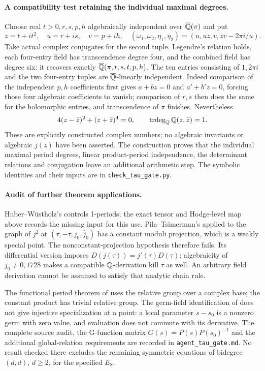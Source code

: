 \paragraph{A compatibility test retaining the individual maximal degrees.}
Choose real $t>0,r,s,p,h$ algebraically independent over $\overline{\mathbb Q}(\pi)$ and put
\[
 z=t+it^2,\quad u=r+is,\quad v=p+ih,\quad
 (\omega_1,\omega_2,\eta_1,\eta_2)
 =(u,uz,v,zv-2\pi i/u).
\]
Take actual complex conjugates for the second tuple. Legendre's relation holds, each four-entry field has transcendence degree four, and the combined field has degree six: it recovers exactly $\overline{\mathbb Q}(\pi,r,s,t,p,h)$. The ten entries consisting of $1,2\pi i$ and the two four-entry tuples are $\overline{\mathbb Q}$-linearly independent. Indeed comparison of the independent $p,h$ coefficients first gives $a+bz=0$ and $a'+b'\bar z=0$, forcing those four algebraic coefficients to vanish; comparison of $r,s$ then does the same for the holomorphic entries, and transcendence of $\pi$ finishes. Nevertheless
\[
 4(z-\bar z)^2+(z+\bar z)^4=0,
 \qquad\operatorname{trdeg}_{\mathbb Q}\mathbb Q(z,\bar z)=1.
\]
These are explicitly constructed complex numbers; no algebraic invariants or algebraic $j(z)$ have been asserted. The construction proves that the individual maximal period degrees, linear product-period independence, the determinant relations and conjugation leave an additional arithmetic step. The symbolic identities and their inputs are in \texttt{check\_tau\_gate.py}.

\paragraph{Audit of further theorem applications.}
Huber--W\"ustholz's \cite[Theorems 9.7 and 9.10, pp.78--79]{TauHuberWuestholz} controls 1-periods; the exact tensor and Hodge-level map above records the missing input for this use. Pila--Tsimerman's \cite[Theorems 1.1--1.3, pp.1--3]{TauPilaTsimerman} applied to the graph of $j^2$ at $(\tau,-\bar\tau,j_0,\bar j_0)$ has a constant moduli projection, which is a weakly special point. The nonconstant-projection hypothesis therefore fails. Its differential version imposes $D(j(\tau))=j'(\tau)D(\tau)$; algebraicity of $j_0\ne0,1728$ makes a compatible $\mathbb Q$-derivation kill $\tau$ as well. An arbitrary field derivation cannot be assumed to satisfy that analytic chain rule.

The functional period theorem of \cite[Theorems 1.1 and 1.3]{EllBakkerTsimerman2025} uses the relative group over a complex base; the constant product has trivial relative group. The germ-field identification of \cite[Theorem 1.1 and \S4.2]{TauBakkerPilaTsimerman} does not give injective specialization at a point: a local parameter $s-s_0$ is a nonzero germ with zero value, and evaluation does not commute with its derivative. The complete source audit, the G-function matrix $G(s)=P(s)P(s_0)^{-1}$ and the additional global-relation requirements are recorded in \texttt{agent\_tau\_gate.md}. No result checked there excludes the remaining symmetric equations of bidegree $(d,d)$, $d\ge2$, for the specified $E_8$.
